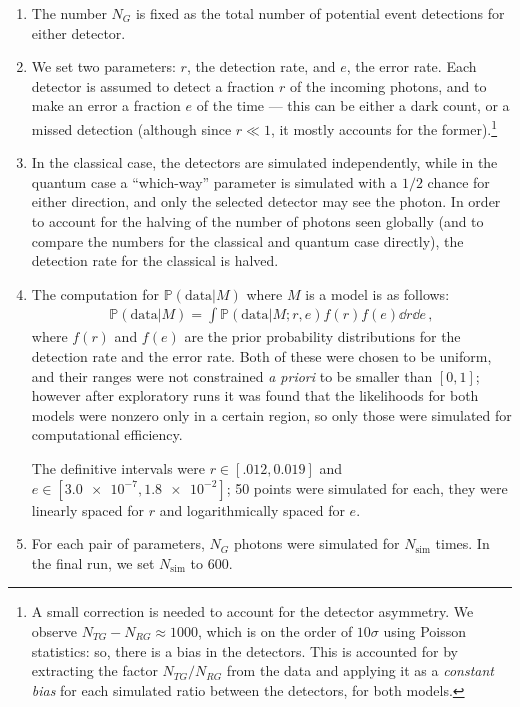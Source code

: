 \documentclass[main.tex]{subfiles}
\begin{document}
\begin{enumerate}
    \item The number \(N_G\) is fixed as the total number of potential event detections for either detector. 
    \item We set two parameters: \(r\), the detection rate, and \(e\), the error rate.
    Each detector is assumed to detect a fraction \(r\) of the incoming photons, and to make an error a fraction \(e\) of the time --- this can be either a dark count, or a missed detection (although since \(r \ll 1\), it mostly accounts for the former).\footnote{A small correction is needed to account for the detector asymmetry. We observe \(N_{TG} - N_{RG} \approx 1000\), which is on the order of \(10 \sigma \) using Poisson statistics: so, there is a bias in the detectors. This is accounted for by extracting the factor \(N_{TG} / N_{RG}\) from the data and applying it as a \emph{constant bias} for each simulated ratio between the detectors, for both models.}
    \item In the classical case, the detectors are simulated independently, while in the quantum case a ``which-way'' parameter is simulated with a \(1/2\) chance for either direction, and only the selected detector may see the photon. In order to account for the halving of the number of photons seen globally (and to compare the numbers for the classical and quantum case directly), the detection rate for the classical is halved.
    \item The computation for \(\mathbb{P}(\text{data} | M)\) where \(M\) is a model is as follows: 
    \begin{align}
    \mathbb{P}(\text{data} | M) = 
    \int \mathbb{P}(\text{data} | M; r, e) f(r) f(e) \dd{r} \dd{e}
    \,,
    \end{align}
    where \(f(r)\) and \(f(e)\) are the prior probability distributions for the detection rate and the error rate. 
    Both of these were chosen to be uniform, and their ranges were not constrained \emph{a priori} to be smaller than \([0,1]\); however after exploratory runs it was found that the likelihoods for both models were nonzero only in a certain region, so only those were simulated for computational efficiency.
    
    The definitive intervals were \(r \in [\num{.012}, \num{0.019}]\) and \(e \in [\num{3.0e-7}, \num{1.8e-2}]\); 50 points were simulated for each, they were linearly spaced for \(r\) and logarithmically spaced for \(e\). 
    \item For each pair of parameters, \(N_G\) photons were simulated for \(N _{\text{sim}}\) times. In the final run, we set \(N _{\text{sim}}\) to 600. 
    

\end{enumerate}
\end{document}
